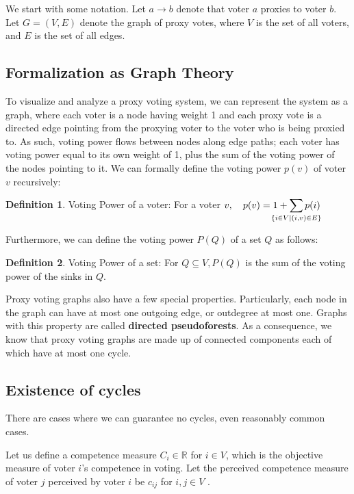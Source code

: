 \documentclass[10pt]{article}
\theoremstyle{definition}
\newtheorem{definition}{Definition}[section]
\begin{document}
We start with some notation. Let $a \rightarrow b$ denote that voter $a$ proxies to voter $b$.  Let $G = (V,E)$ denote the graph of proxy votes, where $V$ is the set of all voters, and $E$ is the set of all edges.

\subsection{Formalization as Graph Theory}
To visualize and analyze a proxy voting system, we can represent the system as a graph, where each voter is a node having weight 1 and each proxy vote is a directed edge pointing from the proxying voter to the voter who is being proxied to. As such, voting power flows between nodes along edge paths; each voter has voting power equal to its own weight of 1, plus the sum of the voting power of the nodes pointing to it. We can formally define the voting power $p(v)$ of voter $v$ recursively:

\theoremstyle{definition}
\begin{definition}{Voting Power of a voter:}
For a voter $v, \quad p(v) = 1 + \smashoperator{\sum\limits_{\{i \in V \mid (i,v) \in E\}}}p(i)$
\end{definition}

Furthermore, we can define the voting power $P(Q)$ of a set $Q$ as follows:

\theoremstyle{definition}
\begin{definition}{Voting Power of a set:}
For $Q \subseteq V, P(Q)$ is the sum of the voting power of the sinks in $Q$.
\end{definition}



Proxy voting graphs also have a few special properties. Particularly, each node in the graph can have at most one outgoing edge, or outdegree at most one. Graphs with this property are called \textbf{directed pseudoforests}. As a consequence, we know that proxy voting graphs are made up of connected components each of which have at most one cycle.




\subsection{Existence of cycles}

There are cases where we can guarantee no cycles, even reasonably common cases.

Let us define a competence measure $C_i \in \mathbb{R}$ for $ i \in V$, which is the objective measure of voter $i$'s competence in voting. Let the perceived competence measure of voter $j$ perceived by voter $i$ be $c_{ij}$ for $i, j \in V$ . 
\end{document}
